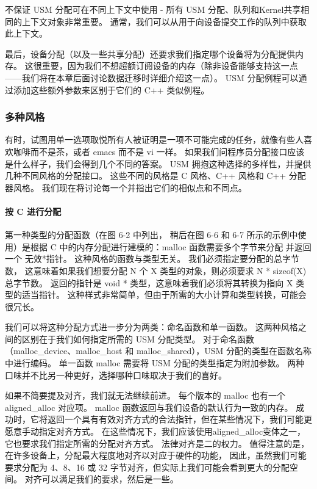 不保证 USM 分配可在不同上下文中使用 - 所有 USM 分配、队列和Kernel共享相同的上下文对象非常重要。 
通常，我们可以从用于向设备提交工作的队列中获取此上下文。

最后，设备分配（以及一些共享分配）还要求我们指定哪个设备将为分配提供内存。 
这很重要，因为我们不想超额订阅设备的内存（除非设备能够支持这一点——我们将在本章后面讨论数据迁移时详细介绍这一点）。 
USM 分配例程可以通过添加这些额外参数来区别于它们的 C++ 类似例程。

\subsubsection{多种风格}
有时，试图用单一选项取悦所有人被证明是一项不可能完成的任务，就像有些人喜欢咖啡而不是茶，或者 emacs 而不是 vi 一样。 
如果我们问程序员分配接口应该是什么样子，我们会得到几个不同的答案。 
USM 拥抱这种选择的多样性，并提供几种不同风格的分配接口。 
这些不同的风格是 C 风格、C++ 风格和 C++ 分配器风格。 我们现在将讨论每一个并指出它们的相似点和不同点。

\paragraph{按 C 进行分配}

第一种类型的分配函数（在图 6-2 中列出，
稍后在图 6-6 和 6-7 所示的示例中使用）是根据 C 中的内存分配进行建模的：malloc 函数需要多个字节来分配
并返回一个 无效*指针。 这种风格的函数与类型无关。 我们必须指定要分配的总字节数，
这意味着如果我们想要分配 N 个 X 类型的对象，则必须要求 N * sizeof(X) 总字节数。 
返回的指针是 void * 类型，这意味着我们必须将其转换为指向 X 类型的适当指针。
这种样式非常简单，但由于所需的大小计算和类型转换，可能会很冗长。

我们可以将这种分配方式进一步分为两类：命名函数和单一函数。 这两种风格之间的区别在于我们如何指定所需的 USM 分配类型。 
对于命名函数（malloc\_device、malloc\_host 和 malloc\_shared），USM 分配的类型在函数名称中进行编码。 
单一函数 malloc 需要将 USM 分配的类型指定为附加参数。 两种口味并不比另一种更好，选择哪种口味取决于我们的喜好。

如果不简要提及对齐，我们就无法继续前进。 每个版本的 malloc 也有一个aligned\_alloc 对应项。 
malloc 函数返回与我们设备的默认行为一致的内存。 
成功时，它将返回一个具有有效对齐方式的合法指针，但在某些情况下，我们可能更愿意手动指定对齐方式。 
在这些情况下，我们应该使用aligned\_alloc变体之一，它也要求我们指定所需的分配对齐方式。 
法律对齐是二的权力。 值得注意的是，在许多设备上，分配最大程度地对齐以对应于硬件的功能，
因此，虽然我们可能要求分配为 4、8、16 或 32 字节对齐，但实际上我们可能会看到更大的分配空间。 
对齐可以满足我们的要求，然后是一些。


